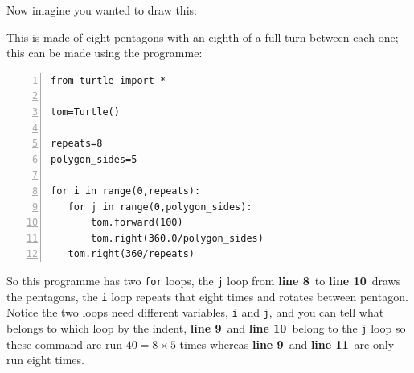 \documentclass[11pt,a4paper]{scrartcl}
\newcommand{\lnn}[1]{\textbf{line #1}\,}
\begin{document}
Now imagine you wanted to draw this:
\begin{center}
\end{center}
This is made of eight pentagons with an eighth of a full turn between
each one; this can be made using the programme:
\begin{lstlisting}[numbers=left]
from turtle import *

tom=Turtle()

repeats=8
polygon_sides=5

for i in range(0,repeats):
   for j in range(0,polygon_sides):
       tom.forward(100)
       tom.right(360.0/polygon_sides)
   tom.right(360/repeats)
\end{lstlisting}
So this programme has two \texttt{for} loops, the \texttt{j} loop from
\lnn{8} to \lnn{10} draws the pentagons, the \texttt{i} loop repeats
that eight times and rotates between pentagon. Notice the two loops
need different variables, \texttt{i} and \texttt{j}, and you can tell
what belongs to which loop by the indent, \lnn{9} and \lnn{10} belong
to the \texttt{j} loop so these command are run $40=8\times 5$ times
whereas \lnn{9} and \lnn{11} are only run eight times.
\end{document}
